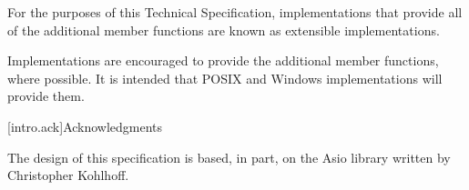 \pnum
For the purposes of this Technical Specification, implementations that provide all of the additional member functions are known as extensible implementations.

\pnum
 \begin{note} Implementations are encouraged to provide the additional member functions, where possible. It is intended that POSIX and Windows implementations will provide them. \end{note}


[intro.ack]{Acknowledgments}

\pnum
The design of this specification is based, in part, on the Asio library
written by Christopher Kohlhoff.


